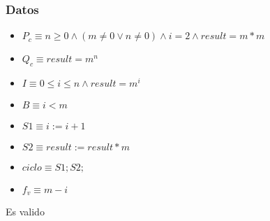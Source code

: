 \documentclass{article}
\begin{document}
\subsubsection*{Datos}
\begin{itemize}
    \item $P_{c}    \equiv n \geq 0 \wedge (m \neq 0 \vee n \neq 0) \wedge i = 2 \wedge result = m*m$
    \item $Q_{c}    \equiv result = m^{n}$
    \item $I        \equiv 0 \leq i \leq n \wedge result = m^{i}$
    \item $B        \equiv i < m$
    \item $S1       \equiv i := i + 1$
    \item $S2       \equiv result := result * m$
    \item $ciclo    \equiv S1;S2;$
    \item $f_{v}    \equiv m-i$
\end{itemize}

Es valido
\end{document}
